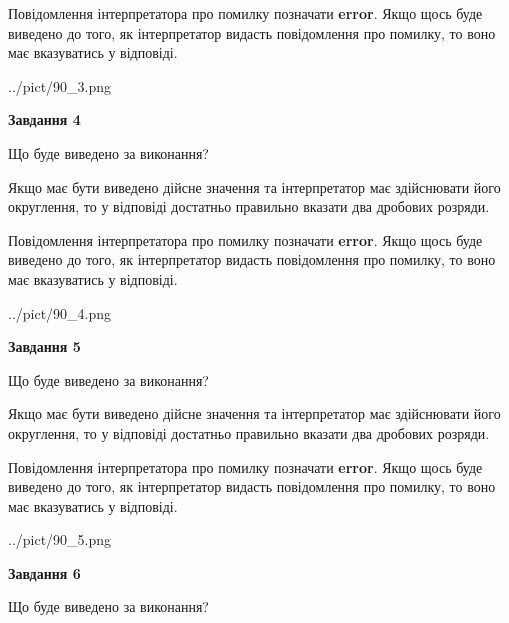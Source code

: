 \documentclass[12pt, ukrainian]{article}
\begin{document}
{\begin {Large}
Повідомлення інтерпретатора про помилку позначати \textbf{error}.
Якщо щось буде виведено до того, як інтерпретатор видасть повідомлення про помилку, 
то воно має вказуватись у відповіді. \par

\begin{center}
	{../pict/90_3.png}
\end{center}
\newpage

{\begin {center}\textbf{Завдання 4}\end {center}}\par
Що буде виведено за виконання? \par

Якщо має бути виведено дійсне значення та інтерпретатор має здійснювати його округлення, 
то у відповіді достатньо правильно вказати два дробових розряди.

Повідомлення інтерпретатора про помилку позначати \textbf{error}.
Якщо щось буде виведено до того, як інтерпретатор видасть повідомлення про помилку, 
то воно має вказуватись у відповіді. \par

\begin{center}
	{../pict/90_4.png}
\end{center}
\newpage

{\begin {center}\textbf{Завдання 5}\end {center}}\par
Що буде виведено за виконання? \par

Якщо має бути виведено дійсне значення та інтерпретатор має здійснювати його округлення, 
то у відповіді достатньо правильно вказати два дробових розряди.

Повідомлення інтерпретатора про помилку позначати \textbf{error}.
Якщо щось буде виведено до того, як інтерпретатор видасть повідомлення про помилку, 
то воно має вказуватись у відповіді. \par

\begin{center}
	{../pict/90_5.png}
\end{center}
\newpage

{\begin {center}\textbf{Завдання 6}\end {center}}\par
Що буде виведено за виконання? \par


\end{Large}}
\end{document}
